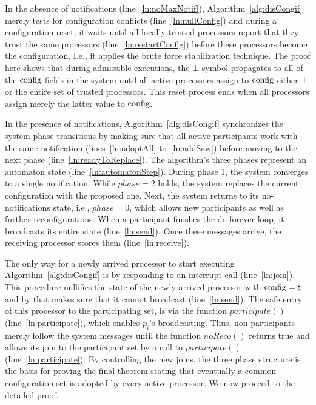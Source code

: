 \documentclass[11pt]{article}
\newcommand{\noReconfig}{noReco}
\begin{document}
In the absence of notifications (line~\ref{ln:noMaxNotif}), 
Algorithm~\ref{alg:disCongif} merely tests for configuration conflicts (line~\ref{ln:nullConfig}) and during a configuration reset, it waits until all locally trusted processors report that they trust the same processors (line~\ref{ln:restartConfig}) before these processors become the configuration. I.e., it applies the brute force stabilization technique. The proof here shows that during admissible executions, the $\bot$ symbol propagates to all of the $\textnormal{config}$ fields in the system until all active processors assign to $\textnormal{config}$ either $\bot$ or the entire set of trusted processors. 
This reset process ends when all processors assign merely the latter value to $\textnormal{config}$.


In the presence of notifications, Algorithm~\ref{alg:disCongif}  synchronizes the system phase transitions by making sure that all active participants work with the same notification (lines~\ref{ln:adoptAll} to~\ref{ln:addSaw}) before moving to the next phase (line~\ref{ln:readyToReplace}). The algorithm's three phases represent an automaton state (line~\ref{ln:automatonStep}). 
During phase $1$, the system converges to a single notification. While $phase=2$ holds, the system replaces the current configuration with the proposed one. Next, the system returns to its no-notifications state, i.e., $phase=0$, which allows new participants as well as further reconfigurations. 
When a participant finishes the do forever loop, it broadcasts its entire state (line~\ref{ln:send}).
Once these messages arrive, the receiving processor stores them (line~\ref{ln:receive}). 

The only way for a newly arrived processor to start executing Algorithm~\ref{alg:disCongif} is by responding to an interrupt call (line~\ref{ln:join}). This procedure nullifies the state of the newly arrived processor with $\textnormal{config}=\sharp$ and by that makes sure that it cannot broadcast (line~\ref{ln:send}). The safe entry of this processor to the participating set, is via the function $participate()$ (line~\ref{ln:participate}), which enables $p_i$'s broadcasting. Thus, non-participants merely follow the system messages until the function $\noReconfig()$ returns true and allows its join to the participant set by a call to $participate()$ (line~\ref{ln:participate}). 
By controlling the new joins, the three phase structure is the basis for proving the final theorem stating that eventually a common configuration set is adopted by every active processor. We now proceed to the detailed proof.
\end{document}
